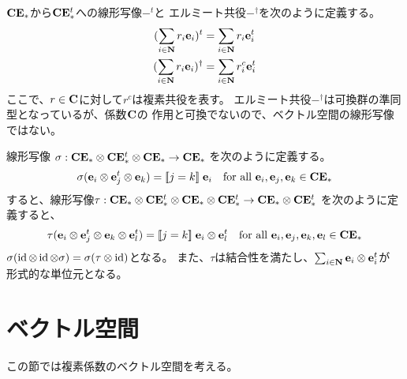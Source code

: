	${\mathbf{C}}\mathbf{E}_*$から${\mathbf{C}}\mathbf{E}_*^t$への線形写像$-^t$と
	エルミート共役$-^\dag$を次のように定義する。
	\begin{equation*}\begin{split} %
		(\sum_{i\in\sizen}r_i\be_i)^t &= \sum_{i\in\sizen}r_i\be_i^t \\
		(\sum_{i\in\sizen}r_i\be_i)^\dag &= \sum_{i\in\sizen}r_i^c\be_i^t \\
	\end{split}\end{equation*} %
	ここで、$r\in{\ensuremath{\mathbf{C}}}$に対して$r^c$は複素共役を表す。
	エルミート共役$-^\dag$は可換群の準同型となっているが、係数${\mathbf{C}}$の
	作用と可換でないので、ベクトル空間の線形写像ではない。

	線形写像
	$\sigma:{\mathbf{C}}\mathbf{E}_*\otimes{\ensuremath{\mathbf{C}}}\mathbf{E}_*^t\otimes{\ensuremath{\mathbf{C}}}\mathbf{E}_*\to{\ensuremath{\mathbf{C}}}\mathbf{E}_*$
	を次のように定義する。
	\begin{equation*}\begin{split} %
		\sigma(\be_i\otimes\be_j^t\otimes\be_k) = \jump{j=k}\be_i
		\quad\text{for all }\be_i,\be_j,\be_k\in\fukuso\bE_*
	\end{split}\end{equation*} %
	すると、線形写像$\tau:{\mathbf{C}}\mathbf{E}_*\otimes{\ensuremath{\mathbf{C}}}\mathbf{E}_*^t\otimes{\ensuremath{\mathbf{C}}}\mathbf{E}_*\otimes{\ensuremath{\mathbf{C}}}\mathbf{E}_*^t \to {\ensuremath{\mathbf{C}}}\mathbf{E}_*\otimes{\ensuremath{\mathbf{C}}}\mathbf{E}_*^t$
	を次のように定義すると、
	\begin{equation*}\begin{split} %
		\tau(\be_i\otimes\be_j^t\otimes\be_k\otimes\be_l^t) 
		= \jump{j=k}\be_i\otimes\be_l^t
		\quad\text{for all }\be_i,\be_j,\be_k,\be_l\in\fukuso\bE_*
	\end{split}\end{equation*} %
	$\sigma(\operatorname{id}\otimes\operatorname{id}\otimes\sigma)=\sigma(\tau\otimes\operatorname{id})$となる。
	また、$\tau$は結合性を満たし、$\sum_{i\in{\ensuremath{\mathbf{N}}}}\mathbf{e}_i\otimes\mathbf{e}_i^t$が
	形式的な単位元となる。

	\begin{todo}[ここまで]\label{todo:ここまで} %
	\end{todo} %
\section{ベクトル空間}\label{s1:ベクトル空間} %
	この節では複素係数のベクトル空間を考える。

